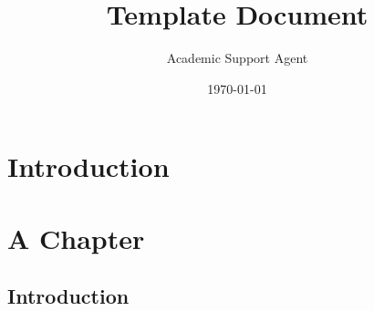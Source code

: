 \documentclass{article}
\title{Template Document}
\author{Academic Support Agent}
\date{\today}
\begin{document}
\maketitle

\maketitle

\makecopyright
\makededication
\makeepigraph






\acknowledgments

\abstract



\chapter{Introduction}

\chapter{A Chapter}
\section{Introduction}

\makebibliography
\nocite{*}


\end{document}
